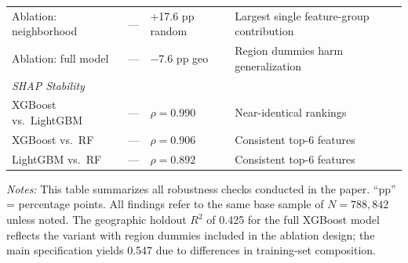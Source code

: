\begin{table}[H]
\begin{threeparttable}
\begin{tabular}{p{3.5cm}p{2.5cm}p{2.5cm}p{4.5cm}}
Ablation: neighborhood & --- & $+$17.6 pp random & Largest single feature-group contribution \\
Ablation: full model & --- & $-$7.6 pp geo & Region dummies harm generalization \\
\midrule
\multicolumn{4}{l}{\textit{SHAP Stability}} \\
XGBoost vs.\ LightGBM & --- & $\rho = 0.990$ & Near-identical rankings \\
XGBoost vs.\ RF & --- & $\rho = 0.906$ & Consistent top-6 features \\
LightGBM vs.\ RF & --- & $\rho = 0.892$ & Consistent top-6 features \\
\bottomrule
\end{tabular}
\begin{tablenotes}
\footnotesize
\item \textit{Notes:} This table summarizes all robustness checks conducted in the paper. ``pp'' = percentage points. All findings refer to the same base sample of $N = 788{,}842$ unless noted. The geographic holdout $R^2$ of 0.425 for the full XGBoost model reflects the variant with region dummies included in the ablation design; the main specification yields 0.547 due to differences in training-set composition.
\end{tablenotes}
\end{threeparttable}
\end{table}
